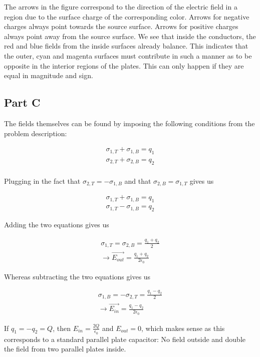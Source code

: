 \documentclass[paper=a4, fontsize=11pt]{scrartcl} %
\numberwithin{equation}{section} %
\numberwithin{figure}{section} %
\numberwithin{table}{section} %
\begin{document}
The arrows in the figure correspond to the direction of the electric field in a region due to the surface charge of the corresponding color. Arrows for negative charges always point towards the source surface. Arrows for positive charges always point away from the source surface. We see that inside the conductors, the red and blue fields from the inside surfaces already balance. This indicates that the outer, cyan and magenta surfaces must contribute in such a manner as to be opposite in the interior regions of the plates. This can only happen if they are equal in magnitude and sign.  

\subsection{Part C}

The fields themselves can be found by imposing the following conditions from the problem description:

\begin{align}
\sigma_{1,T} + \sigma_{1,B} = q_1 \\
\sigma_{2,T} + \sigma_{2,B} = q_2 \\
\end{align}

Plugging in the fact that $\sigma_{2,T} = - \sigma_{1,B}$ and that $\sigma_{2,B} = \sigma_{1,T}$ gives us

\begin{align}
\sigma_{1,T} + \sigma_{1,B} = q_1 \\
\sigma_{1,T} - \sigma_{1,B} = q_2 
\end{align}

Adding the two equations gives us

\begin{align}
\sigma_{1,T} = \sigma_{2,B} = \frac{q_1 + q_2}{2} \\
\rightarrow \vec{E_{out}} = \frac{q_1 + q_2}{2 \epsilon_0}
\end{align}

Whereas subtracting the two equations gives us

\begin{align}
\sigma_{1,B} = -\sigma_{2,T} = \frac{q_1 - q_2}{2} \\
\rightarrow \vec{E_{in}} = \frac{q_1 - q_2}{2 \epsilon_0}
\end{align}

If $q_1 = -q_2 = Q$, then $E_{in} = \frac{2Q}{\epsilon_0}$ and $E_{out} = 0$, which makes sense as this corresponds to a standard parallel plate capacitor: No field outside and double the field from two parallel plates inside. 
\end{document}
